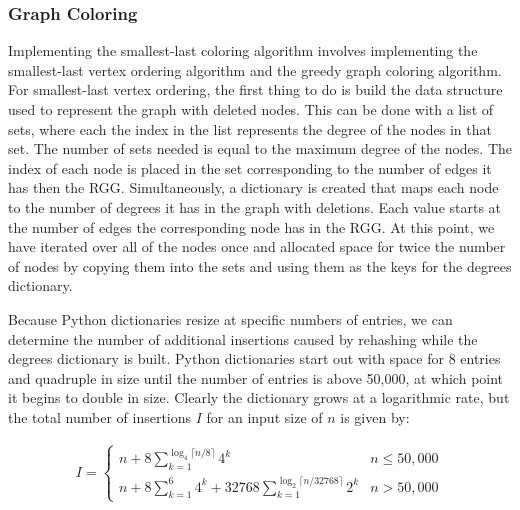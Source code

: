\documentclass{article}
\begin{document}
        \subsubsection{Graph Coloring}
        Implementing the smallest-last coloring algorithm involves implementing the smallest-last vertex ordering algorithm and the greedy graph coloring algorithm. For smallest-last vertex ordering, the first thing to do is build the data structure used to represent the graph with deleted nodes. This can be done with a list of sets, where each the index in the list represents the degree of the nodes in that set. The number of sets needed is equal to the maximum degree of the nodes. The index of each node is placed in the set corresponding to the number of edges it has then the RGG. Simultaneously, a dictionary is created that maps each node to the number of degrees it has in the graph with deletions. Each value starts at the number of edges the corresponding node has in the RGG. At this point, we have iterated over all of the nodes once and allocated space for twice the number of nodes by copying them into the sets and using them as the keys for the degrees dictionary.
        \par
        Because Python dictionaries resize at specific numbers of entries, we can determine the number of additional insertions caused by rehashing while the degrees dictionary is built. Python dictionaries start out with space for 8 entries and quadruple in size until the number of entries is above 50,000, at which point it begins to double in size. Clearly the dictionary grows at a logarithmic rate, but the total number of insertions $I$ for an input size of $n$ is given by:

        \begin{align}
            I =
            \begin{cases}
                n + 8\sum_{k=1}^{\log_4\lceil n/8\rceil}4^k & n \leq 50,000 \\
                n + 8\sum_{k=1}^{6}4^k + 32768\sum_{k=1}^{\log_2\lceil n/32768\rceil}2^k & n > 50,000
            \end{cases}
        \end{align}
\end{document}
